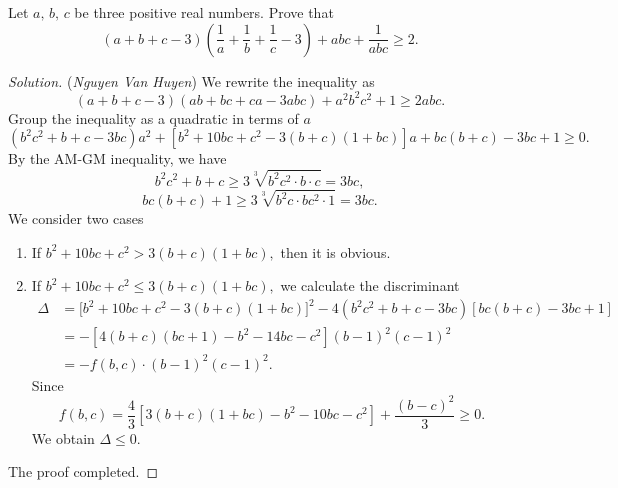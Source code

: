 \documentclass[12pt,a4paper]{book}
\begin{document}
\begin{pro_no_count}
Let $a,\,b,\,c$ be three positive real numbers. Prove that
\[(a+b+c-3)\left(\frac{1}{a}+\frac{1}{b}+\frac{1}{c}-3\right)+abc+\frac{1}{abc} \geqslant 2.\]
\end{pro_no_count}

\begin{proof}[\cmss\problemColor Solution] (\textit{Nguyen Van Huyen}) We rewrite the inequality as
\[(a+b+c-3)(ab+bc+ca-3abc)+a^2b^2c^2+1 \geqslant 2abc.\]
Group the inequality as a quadratic in terms of $a$
\[(b^2c^2+b+c-3bc)a^2 + [b^2+10bc+c^2 - 3(b+c)(1+bc)]a + bc(b+c) - 3bc + 1 \ge 0.\]
By the AM-GM inequality, we have
\[b^2c^2+b+c \geqslant 3\sqrt[3]{b^2c^2 \cdot b \cdot c} = 3bc,\]
\[bc(b+c) + 1 \geqslant 3\sqrt[3]{b^2c \cdot bc^2 \cdot 1} = 3bc.\]
We consider two cases
\begin{enumerate}[(1)]
\item If $b^2+10bc+c^2 > 3(b+c)(1+bc),$ then it is obvious.
\item If $b^2+10bc+c^2 \le 3(b+c)(1+bc),$ we calculate the discriminant
\[\begin{aligned}
\Delta &= \big[b^2+10bc+c^2 - 3(b+c)(1+bc)\big]^2 - 4(b^2c^2+b+c-3bc)[bc(b+c) - 3bc + 1] \\
&= -[4(b+c)(bc+1) - b^2-14bc-c^2](b-1)^2(c-1)^2 \\
&= - f(b,c) \cdot (b-1)^2(c-1)^2.
\end{aligned}\]
Since 
\[f(b,c) = \frac{4}{3}[3(b+c)(1+bc)-b^2-10bc-c^2]+\frac{(b-c)^2}{3} \ge 0.\] 
We obtain $\Delta \le 0.$
\end{enumerate}
The proof completed.
\end{proof}

%
\end{document}
